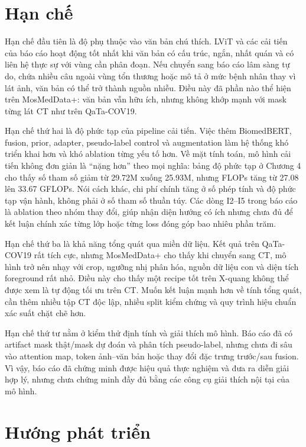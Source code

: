 \section{Hạn chế}

Hạn chế đầu tiên là độ phụ thuộc vào văn bản chú thích. LViT và các cải tiến của báo cáo hoạt động tốt nhất khi văn bản có cấu trúc, ngắn, nhất quán và có liên hệ thực sự với vùng cần phân đoạn. Nếu chuyển sang báo cáo lâm sàng tự do, chứa nhiều câu ngoài vùng tổn thương hoặc mô tả ở mức bệnh nhân thay vì lát ảnh, văn bản có thể trở thành nguồn nhiễu. Điều này đã phần nào thể hiện trên MosMedData+: văn bản vẫn hữu ích, nhưng không khớp mạnh với mask từng lát CT như trên QaTa-COV19.

Hạn chế thứ hai là độ phức tạp của pipeline cải tiến. Việc thêm BiomedBERT, fusion, prior, adapter, pseudo-label control và augmentation làm hệ thống khó triển khai hơn và khó ablation từng yếu tố hơn. Về mặt tính toán, mô hình cải tiến không đơn giản là ``nặng hơn'' theo mọi nghĩa: bảng độ phức tạp ở Chương 4 cho thấy số tham số giảm từ 29.72M xuống 25.93M, nhưng FLOPs tăng từ 27.08 lên 33.67 GFLOPs. Nói cách khác, chi phí chính tăng ở số phép tính và độ phức tạp vận hành, không phải ở số tham số thuần túy. Các dòng I2--I5 trong báo cáo là ablation theo nhóm thay đổi, giúp nhận diện hướng có ích nhưng chưa đủ để kết luận chính xác từng lớp hoặc từng loss đóng góp bao nhiêu phần trăm.

Hạn chế thứ ba là khả năng tổng quát qua miền dữ liệu. Kết quả trên QaTa-COV19 rất tích cực, nhưng MosMedData+ cho thấy khi chuyển sang CT, mô hình trở nên nhạy với crop, ngưỡng nhị phân hóa, nguồn dữ liệu con và diện tích foreground rất nhỏ. Điều này cho thấy một recipe tốt trên X-quang không thể được xem là tự động tối ưu trên CT. Muốn kết luận mạnh hơn về tính tổng quát, cần thêm nhiều tập CT độc lập, nhiều split kiểm chứng và quy trình hiệu chuẩn xác suất chặt chẽ hơn.

Hạn chế thứ tư nằm ở kiểm thử định tính và giải thích mô hình. Báo cáo đã có artifact mask thật/mask dự đoán và phân tích pseudo-label, nhưng chưa đi sâu vào attention map, token ảnh--văn bản hoặc thay đổi đặc trưng trước/sau fusion. Vì vậy, báo cáo đã chứng minh được hiệu quả thực nghiệm và đưa ra diễn giải hợp lý, nhưng chưa chứng minh đầy đủ bằng các công cụ giải thích nội tại của mô hình.

\section{Hướng phát triển}

